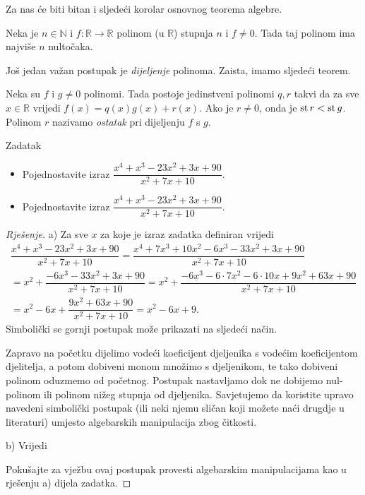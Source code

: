 Za nas će biti bitan i sljedeći korolar osnovnog teorema algebre.
\begin{remark}
\label{atmostn}
Neka je $n\in \mathbb{N}$ i $f : \mathbb{R}\to \mathbb{R}$ polinom (u $\mathbb{R}$) stupnja $n$ i $f\neq 0$. Tada taj polinom ima najviše $n$ nultočaka.
\end{remark}
Još jedan važan postupak je \textit{dijeljenje} polinoma. Zaista, imamo sljedeći teorem.
\begin{remark}
Neka su $f$ i $g\neq 0$ polinomi. Tada postoje jedinstveni polinomi $q, r$ takvi da za sve $x\in \mathbb{R}$ vrijedi $f(x)=q(x)g(x)+r(x)$. Ako je $r\neq 0$, onda je $\operatorname{st}{r}<\operatorname{st}{g}$. Polinom $r$ nazivamo \textit{ostatak} pri dijeljenju $f$ s $g$.
\end{remark}
\begin{exercise}{Zadatak} \textbf{}
\begin{itemize}
\item[a)] Pojednostavite izraz $\dfrac{x^4+x^3-23x^2+3x+90}{x^2+7x+10}$.
\item[b)] Pojednostavite izraz $\dfrac{x^4+x^3-23x^2+3x+90}{x^2+7x+10}$.
\end{itemize}
\end{exercise}
\begin{proof}[Rješenje]
a) Za sve $x$ za koje je izraz zadatka definiran vrijedi
\begin{gather*}
\dfrac{x^4+x^3-23x^2+3x+90}{x^2+7x+10}=\dfrac{x^4+7x^3+10x^2-6x^3-33x^2+3x+90}{x^2+7x+10}\\
=x^2+\dfrac{-6x^3-33x^2+3x+90}{x^2+7x+10}
=x^2+\dfrac{-6x^3-6\cdot 7x^2-6\cdot 10x+9x^2+63x+90}{x^2+7x+10}\\
=x^2-6x+\dfrac{9x^2+63x+90}{x^2+7x+10}=x^2-6x+9.
\end{gather*}
Simbolički se gornji postupak može prikazati na sljedeći način.
\begin{center}
\end{center}
Zapravo na početku dijelimo vodeći koeficijent djeljenika s vodećim koeficijentom djelitelja, a potom dobiveni monom množimo s djeljenikom, te tako dobiveni polinom oduzmemo od početnog. Postupak nastavljamo dok ne dobijemo nul-polinom ili polinom nižeg stupnja od djeljenika. Savjetujemo da koristite upravo navedeni simbolički postupak (ili neki njemu sličan koji možete naći drugdje u literaturi) umjesto algebarskih manipulacija zbog čitkosti.

b) Vrijedi
\begin{center}
\end{center}
Pokušajte za vježbu ovaj postupak provesti algebarskim manipulacijama kao u rješenju a) dijela zadatka.
\end{proof}

